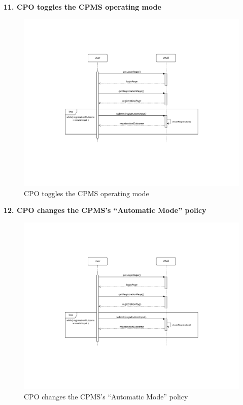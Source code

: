 \documentclass[11pt]{article}
\begin{document}
\begin{description}
    \item \textbf{11. CPO toggles the CPMS operating mode}
    \begin{figure}[!ht]
        \centering
        \includegraphics[page={11}, trim=5cm 9cm 5.7cm 3.5cm, width=0.8\linewidth, clip]{SequenceDiagrams.pdf}
        \caption{CPO toggles the CPMS operating mode}
    \end{figure}
    
    \item \textbf{12. CPO changes the CPMS’s “Automatic Mode” policy}
    \begin{figure}[!ht]
        \centering
        \includegraphics[page={12}, trim=4.4cm 4.4cm 5.4cm 4.4cm, width=0.8\linewidth, clip]{SequenceDiagrams.pdf}
        \caption{CPO changes the CPMS’s “Automatic Mode” policy}
    \end{figure}
\end{description}
\end{document}
